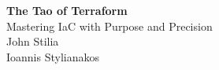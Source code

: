 \cleardoublepage  %
\thispagestyle{empty}  %

\begin{center}
\vspace*{2in}  %

{\Huge\bfseries The Tao of Terraform}\\[0.5cm]

{\large Mastering IaC with Purpose and Precision}\\[6cm]  %

{\large John Stilia}\\[0.5cm]
{\small Ioannis Stylianakos}\\[0.1cm]

\vfill  %
\end{center}

\clearpage 